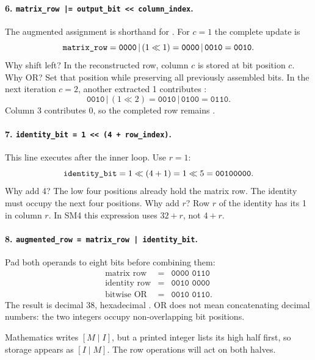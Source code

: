 \paragraph{6. \texttt{matrix\_row |= output\_bit << column\_index}.}
The augmented assignment is shorthand for
.
For $c=1$ the complete update is
\[
\texttt{matrix\_row}=\texttt{0000}\,|\,(1\ll1)
=\texttt{0000}\,|\,\texttt{0010}=\texttt{0010}.
\]
Why shift left? In the reconstructed row, column $c$ is stored at bit position
$c$. Why OR? Set that position while preserving all previously assembled bits.
In the next iteration $c=2$, another extracted 1 contributes :
\[
\texttt{0010}\,|\,(1\ll2)
=\texttt{0010}\,|\,\texttt{0100}=\texttt{0110}.
\]
Column 3 contributes 0, so the completed row remains .

\paragraph{7. \texttt{identity\_bit = 1 << (4 + row\_index)}.}
This line executes after the inner loop. Use $r=1$:
\[
\texttt{identity\_bit}=1\ll(4+1)=1\ll5=\texttt{00100000}.
\]
Why add 4? The low four positions already hold the matrix row. The identity
must occupy the next four positions. Why add $r$? Row $r$ of the identity has
its 1 in column $r$. In SM4 this expression uses $32+r$, not $4+r$.

\paragraph{8. \texttt{augmented\_row = matrix\_row | identity\_bit}.}
Pad both operands to eight bits before combining them:
\[
\begin{array}{rcl}
\text{matrix row}&=&\texttt{0000\ 0110}\\
\text{identity row}&=&\texttt{0010\ 0000}\\\hline
\text{bitwise OR}&=&\texttt{0010\ 0110}.
\end{array}
\]
The result is decimal 38, hexadecimal . OR does not mean concatenating
decimal numbers: the two integers occupy non-overlapping bit positions.

\begin{center}
\end{center}
Mathematics writes $[M\mid I]$, but a printed integer lists its high half first,
so storage appears as $[I\mid M]$. The row operations will act on both halves.

